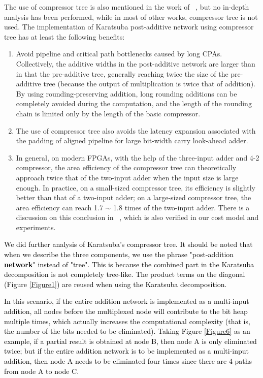 \documentclass[conference]{IEEEtran}
\begin{document}
The use of compressor tree is also mentioned in the work of ~\cite{Heuristics_for_the_Design_of_Large_Multipliers_for_FPGAs}, but no in-depth analysis has been performed, while in most of other works, compressor tree is not used. The implementation of Karatsuba post-additive network using compressor tree has at least the following benefits:
\begin{enumerate}[(1)]
    \item Avoid pipeline and critical path bottlenecks caused by long CPAs. Collectively, the additive widths in the post-additive network are larger than in that the pre-additive tree, generally reaching twice the size of the pre-additive tree (because the output of multiplication is twice that of addition). By using rounding-preserving addition, long rounding additions can be completely avoided during the computation, and the length of the rounding chain is limited only by the length of the basic compressor.
    \item The use of compressor tree also avoids the latency expansion associated with the padding of aligned pipeline for large bit-width carry look-ahead adder.
    \item In general, on modern FPGAs, with the help of the three-input adder and 4-2 compressor, the area efficiency of the compressor tree can theoretically approach twice that of the two-input adder when the input size is large enough. In practice, on a small-sized compressor tree, its efficiency is slightly better than that of a two-input adder; on a large-sized compressor tree, the area efficiency can reach 1.7 $\sim$  1.8 times of the two-input adder. There is a discussion on this conclusion in ~\cite{Karatsuba_with_Rectangular_Multipliers_for_FPGAs}, which is also verified in our cost model and experiments.
\end{enumerate}

\textcolor{black}{
We did further analysis of Karatsuba's compressor tree. It should be noted that when we describe the three components, we use the phrase "post-addition \textbf{network}" instead of "tree". This is because the combined part in the Karatsuba decomposition is not completely tree-like. The product terms on the diagonal (Figure \ref{Figure1}) are reused when using the Karatsuba decomposition.
}

\textcolor{black}{
In this scenario, if the entire addition network is implemented as a multi-input addition, all nodes before the multiplexed node will contribute to the bit heap multiple times, which actually increases the computational complexity (that is, the number of the bits needed to be eliminated). Taking Figure \ref{Figure6} as an example, if a partial result is obtained at node B, then node A is only eliminated twice; but if the entire addition network is to be implemented as a multi-input addition, then node A needs to be eliminated four times since there are 4 paths from node A to node C.
}
\end{document}
